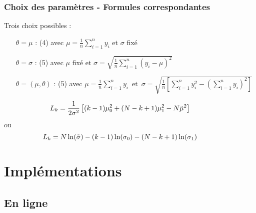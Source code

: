 \documentclass{beamer}
\begin{document}
\begin{frame}
	\frametitle{Choix des paramètres - Formules correspondantes}
	Trois choix possibles :
	\vspace*{.3cm}
	\begin{itemize}
		\item[$\theta=\mu$]: (4) avec $\mu=\frac1n\sum_{i=1}^ny_i$ et $\sigma$ fixé
		\vspace*{.2cm}
		\item[$\theta=\sigma$]:  (5) avec $\mu$ fixé et $\sigma=\sqrt{\frac1n\sum_{i=1}^n(y_i-\mu)^2}$
		\vspace*{.2cm}
		\item[$\theta=(\mu,\theta)$]: (5) avec \mbox{$\mu=\frac1n\sum_{i=1}^ny_i$ et $\sigma=\sqrt{\frac1n\left[\sum_{i=1}^ny_i^2-(\sum_{i=1}^ny_i)^2\right]}$}
	\end{itemize}
	\vspace*{0.8cm}
	\begin{equation}
	\hspace{-1cm}	L_k=\frac 1{2\sigma^2}\left[(k-1)\mu_0^2+(N-k+1)\mu_1^2-N\tilde\mu^2\right]
	\end{equation}
	ou
	\begin{equation}
	\hspace{-1cm}	L_k=N\ln(\tilde\sigma)-(k-1)\ln(\sigma_0)-(N-k+1)\ln(\sigma_1)
	\end{equation}
\end{frame}

\section{Implémentations}

\subsection{En ligne}
\end{document}

